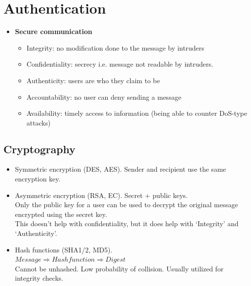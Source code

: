 \documentclass[parskip=half]{scrartcl}
\begin{document}
\section{Authentication} %
\label{sec:authentication}

    \begin{itemize}
        \item 
        \textbf{Secure communication}
        \begin{itemize}
            \item 
            Integrity: no modification done to the message by intruders
            \item 
            Confidentiality: secrecy i.e. message not readable by intruders.
            \item 
            Authenticity: users are who they claim to be
            \item 
            Accountability: no user can deny sending a message
            \item 
            Availability: timely access to information (being able to counter DoS-type attacks)
        \end{itemize}
    \end{itemize}

    \subsection{Cryptography} %
    \label{sec:cryptography}
    
        \begin{itemize}
            \item 
            Symmetric encryption (DES, AES). Sender and recipient use the same encryption key.
            \item 
            Asymmetric encryption (RSA, EC). Secret + public keys. \\
            Only the public key for a user can be used to decrypt the original message encrypted using the secret key.\\
            This doesn't help with confidentiality, but it does help with `Integrity' and `Authenticity'.
            \item 
            Hash functions (SHA1/2, MD5). \\
            $Message \Rightarrow Hash function \Rightarrow Digest$ \\
            Cannot be unhashed. Low probability of collision. Usually utilized for integrity checks.
        \end{itemize}
\end{document}
